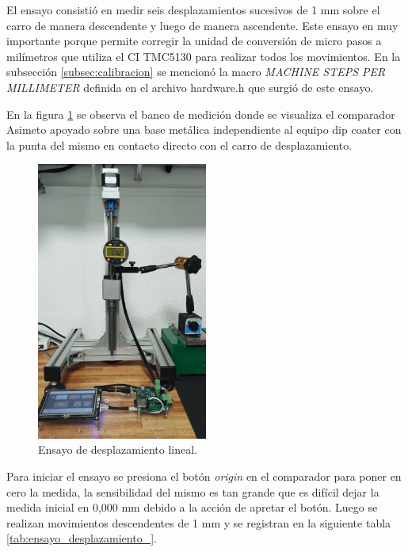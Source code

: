 El ensayo consistió en medir seis desplazamientos sucesivos de 1 mm sobre el carro de manera descendente y luego de manera ascendente. Este ensayo en muy importante porque permite corregir la unidad de conversión de micro pasos a milímetros que utiliza el CI TMC5130 para realizar todos los movimientos. 
En la subsección \ref{subsec:calibracion} se mencionó la macro \textit{MACHINE STEPS PER MILLIMETER} definida en el archivo hardware.h que surgió de este ensayo. 

En la figura \ref{fig:desplazamiento_lineal} se observa el banco de medición donde se visualiza el comparador Asimeto apoyado sobre una base metálica independiente al equipo dip coater con la punta del mismo en contacto directo con el carro de desplazamiento.

\begin{figure}[h]
\centering 
\includegraphics[width=0.5\textwidth]{./Figures/desplazamiento_lineal.png}
\caption{Ensayo de desplazamiento lineal.}
\label{fig:desplazamiento_lineal}
\end{figure}


Para iniciar el ensayo se presiona el botón \textit{origin} en el comparador para poner en cero la medida, la sensibilidad del mismo es tan grande que es difícil dejar la medida inicial en 0,000 mm debido  a la acción de apretar el botón. Luego se realizan movimientos descendentes de 1 mm y se registran en la siguiente tabla \ref{tab:ensayo_desplazamiento_}.

